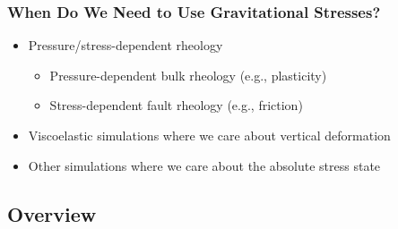 \documentclass{beamer}
\begin{document}
\begin{frame}
  \frametitle{When Do We Need to Use Gravitational Stresses?}
  \summary{}

  \begin{itemize}
  \item Pressure/stress-dependent rheology
    \begin{itemize}
    \item Pressure-dependent bulk rheology (e.g., plasticity)
    \item Stress-dependent fault rheology (e.g., friction)
    \end{itemize}
  \item Viscoelastic simulations where we care about vertical
    deformation
  \item Other simulations where we care about the absolute stress
    state
  \end{itemize}
  
\end{frame}


\subsection{Overview}
\end{document}
